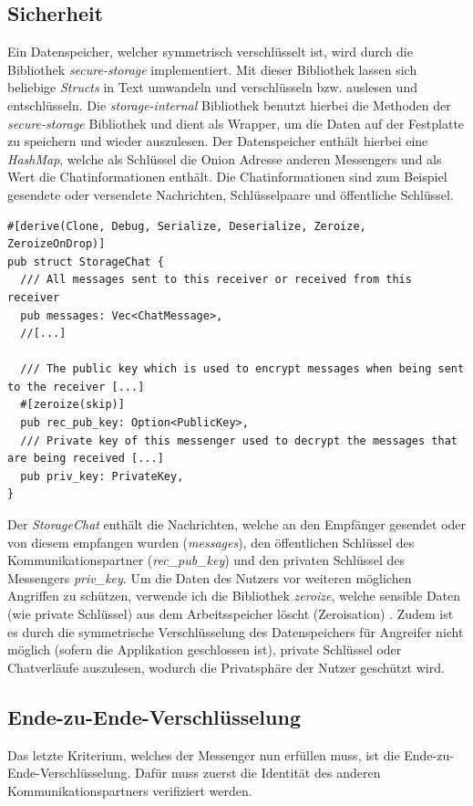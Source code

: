 \documentclass[a4paper,ngerman, headheight=28pt,12pt]{scrartcl}
\newcommand{\vcite}[1]{\cite[vgl.][]{#1}}
\begin{document}
\subsection{Sicherheit}
Ein Datenspeicher, welcher symmetrisch verschlüsselt ist, wird durch die Bibliothek \textit{secure-storage} implementiert. Mit dieser Bibliothek lassen sich beliebige \textit{Structs} in Text umwandeln und verschlüsseln bzw. auslesen und entschlüsseln. Die \textit{storage-internal} Bibliothek benutzt hierbei die Methoden der \textit{secure-storage} Bibliothek und dient als Wrapper, um die Daten auf der Festplatte zu speichern und wieder auszulesen. Der Datenspeicher enthält hierbei eine \textit{HashMap}, welche als Schlüssel die Onion Adresse anderen Messengers und als Wert die Chatinformationen enthält. Die Chatinformationen sind zum Beispiel gesendete oder versendete Nachrichten, Schlüsselpaare und öffentliche Schlüssel.
\begin{verbatim}
#[derive(Clone, Debug, Serialize, Deserialize, Zeroize, ZeroizeOnDrop)]
pub struct StorageChat {
  /// All messages sent to this receiver or received from this receiver
  pub messages: Vec<ChatMessage>,
  //[...]

  /// The public key which is used to encrypt messages when being sent to the receiver [...]
  #[zeroize(skip)]
  pub rec_pub_key: Option<PublicKey>,
  /// Private key of this messenger used to decrypt the messages that are being received [...]
  pub priv_key: PrivateKey,
}
\end{verbatim}
Der \textit{StorageChat} enthält die Nachrichten, welche an den Empfänger gesendet oder von diesem empfangen wurden (\textit{messages}), den öffentlichen Schlüssel des Kommunikationspartner (\textit{rec\_pub\_key}) und den privaten Schlüssel des Messengers \textit{priv\_key}.
Um die Daten des Nutzers vor weiteren möglichen Angriffen zu schützen, verwende ich die Bibliothek \textit{zeroize}, welche sensible Daten (wie private Schlüssel) aus dem Arbeitsspeicher löscht (Zeroisation) \vcite{Zeroization}. Zudem ist es durch die symmetrische Verschlüsselung des Datenspeichers für Angreifer nicht möglich (sofern die Applikation geschlossen ist), private Schlüssel oder Chatverläufe auszulesen, wodurch die Privatsphäre der Nutzer geschützt wird.

\subsection{Ende-zu-Ende-Verschlüsselung}
Das letzte Kriterium, welches der Messenger nun erfüllen muss, ist die Ende-zu-Ende-Verschlüsselung. Dafür muss zuerst die Identität des anderen Kommunikationspartners verifiziert werden.
\end{document}
